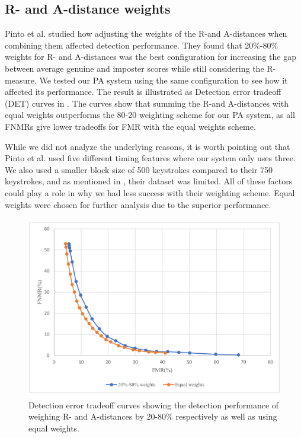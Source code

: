 \subsection{R- and A-distance weights}
Pinto et al. \cite{Pinto2014} studied how adjusting the weights of the R-and A-distances when combining them affected detection performance.
They found that 20\%-80\% weights for R- and A-distances was the best configuration for increasing the gap between average genuine and imposter scores while still considering the R-measure.
We tested our PA system using the same configuration to see how it affected its performance.
The result is illustrated as Detection error tradeoff (DET) curves in .
The curves show that summing the R-and A-distances with equal weights outperforms the 80-20 weighting scheme for our PA system, as all FNMRs give lower tradeoffs for FMR with the equal weights scheme.

While we did not analyze the underlying reasons, it is worth pointing out that Pinto et al. used five different timing features where our system only uses three.
We also used a smaller block size of 500 keystrokes compared to their 750 keystrokes, and as mentioned in , their dataset was limited.
All of these factors could play a role in why we had less success with their weighting scheme.
Equal weights were chosen for further analysis due to the superior performance.

\begin{figure}[ht]
    \centering
    \includegraphics[width=1\textwidth]{figures/RAweights.pdf}
    \caption{Detection error tradeoff curves showing the detection performance of weighing R- and A-distances by 20-80\% respectively as well as using equal weights. }
    \label{fig:RAweights}
\end{figure}


